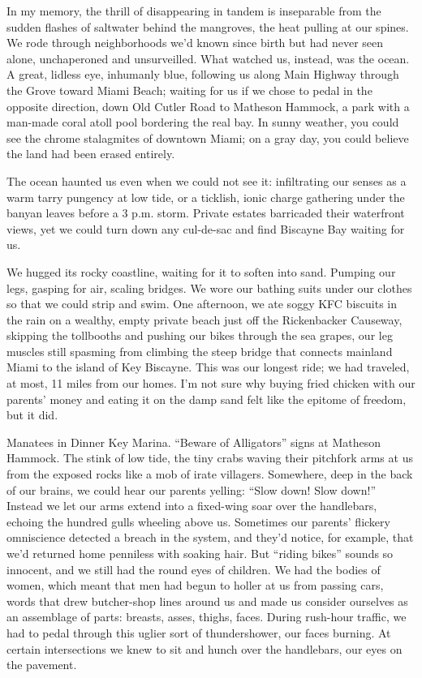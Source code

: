 In my memory, the thrill of disappearing in tandem is inseparable from
the sudden flashes of saltwater behind the mangroves, the heat pulling
at our spines. We rode through neighborhoods we'd known since birth but
had never seen alone, unchaperoned and unsurveilled. What watched us,
instead, was the ocean. A great, lidless eye, inhumanly blue, following
us along Main Highway through the Grove toward Miami Beach; waiting for
us if we chose to pedal in the opposite direction, down Old Cutler Road
to Matheson Hammock, a park with a man-made coral atoll pool bordering
the real bay. In sunny weather, you could see the chrome stalagmites of
downtown Miami; on a gray day, you could believe the land had been
erased entirely.

The ocean haunted us even when we could not see it: infiltrating our
senses as a warm tarry pungency at low tide, or a ticklish, ionic charge
gathering under the banyan leaves before a 3 p.m. storm. Private estates
barricaded their waterfront views, yet we could turn down any cul-de-sac
and find Biscayne Bay waiting for us.

We hugged its rocky coastline, waiting for it to soften into sand.
Pumping our legs, gasping for air, scaling bridges. We wore our bathing
suits under our clothes so that we could strip and swim. One afternoon,
we ate soggy KFC biscuits in the rain on a wealthy, empty private beach
just off the Rickenbacker Causeway, skipping the tollbooths and pushing
our bikes through the sea grapes, our leg muscles still spasming from
climbing the steep bridge that connects mainland Miami to the island of
Key Biscayne. This was our longest ride; we had traveled, at most, 11
miles from our homes. I'm not sure why buying fried chicken with our
parents' money and eating it on the damp sand felt like the epitome of
freedom, but it did.

Manatees in Dinner Key Marina. ``Beware of Alligators'' signs at
Matheson Hammock. The stink of low tide, the tiny crabs waving their
pitchfork arms at us from the exposed rocks like a mob of irate
villagers. Somewhere, deep in the back of our brains, we could hear our
parents yelling: ``Slow down! Slow down!'' Instead we let our arms
extend into a fixed-wing soar over the handlebars, echoing the hundred
gulls wheeling above us. Sometimes our parents' flickery omniscience
detected a breach in the system, and they'd notice, for example, that
we'd returned home penniless with soaking hair. But ``riding bikes''
sounds so innocent, and we still had the round eyes of children. We had
the bodies of women, which meant that men had begun to holler at us from
passing cars, words that drew butcher-shop lines around us and made us
consider ourselves as an assemblage of parts: breasts, asses, thighs,
faces. During rush-hour traffic, we had to pedal through this uglier
sort of thundershower, our faces burning. At certain intersections we
knew to sit and hunch over the handlebars, our eyes on the pavement.

